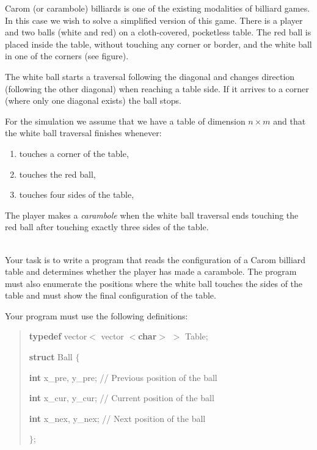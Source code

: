 
\Statement

Carom (or carambole) billiards is one of the existing modalities of billiard games. In this case we wish to solve a simplified version of this game. 
There is a player and two balls (white and red) on a cloth-covered, pocketless table.  The red ball is placed inside the table, without touching any  corner or border, and the white ball in one of the corners (see figure).

The white ball starts a traversal following the diagonal and changes direction (following the other diagonal) when reaching a table side.  If it arrives to a corner (where only one diagonal exists) the ball stops.
  

For the simulation we assume that we have a table of dimension $n\times m$ and that the white ball traversal finishes whenever:
\begin{enumerate}
    \item touches a corner of the table, 
    \item touches the red ball, 
    \item touches four sides of the table,
    \end{enumerate}

The player makes a \emph{carambole} when the white ball traversal ends touching the red ball after touching exactly three sides of the table. 

\ \\
Your task is to write a program that reads the configuration of a Carom billiard table and determines whether the player has made a carambole.   The program must also enumerate the positions where the white ball touches the sides of the table and must show the final configuration of the table.



Your program must use the following definitions:

\begin{quote}

\textbf{typedef} vector$<$ vector $<$\textbf{char}$>$ $>$ Table;

\textbf{struct}  Ball $\{$ 

\hspace{10pt} \textbf{int} x\_pre, y\_pre;\hspace{10pt} // Previous position of the ball

\hspace{10pt} \textbf{int} x\_cur, y\_cur;\hspace{11pt} // Current position of the ball

\hspace{10pt} \textbf{int} x\_nex, y\_nex;\hspace{10pt} // Next position of the ball

$\}$;

\end{quote}

